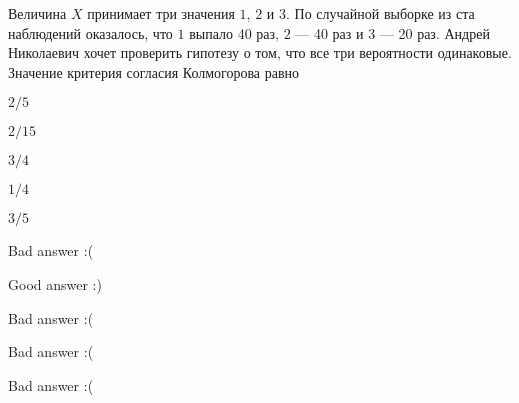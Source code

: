 
\begin{question}
Величина \(X\) принимает три значения \(1\), \(2\) и \(3\). По случайной
выборке из ста наблюдений оказалось, что \(1\) выпало 40 раз, \(2\) ---
40 раз и \(3\) --- 20 раз. Андрей Николаевич хочет проверить гипотезу о
том, что все три вероятности одинаковые. Значение критерия согласия
Колмогорова равно
\begin{answerlist}
  \item \(2/5\)
  \item \(2/15\)
  \item \(3/4\)
  \item \(1/4\)
  \item \(3/5\)
\end{answerlist}
\end{question}

\begin{solution}
\begin{answerlist}
  \item Bad answer :(
  \item Good answer :)
  \item Bad answer :(
  \item Bad answer :(
  \item Bad answer :(
\end{answerlist}
\end{solution}

